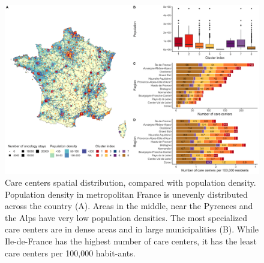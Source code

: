\begin{figure}[H]
    \includegraphics[width=\textwidth]{images/camion/supplemental/sup_fig4_care_centers_pop_density.png}
    \centering
    \caption{
        Care centers spatial distribution, compared with population density. Population density in metropolitan France is unevenly distributed across the country (A). Areas in the middle, near the Pyrenees and the Alps have very low population densities. The most specialized care centers are in dense areas and in large municipalities (B). While Ile-de-France has the highest number of care centers, it has the least care centers per 100,000 habit-ants.
    }
    \label{fig:clustering-map}
\end{figure}


